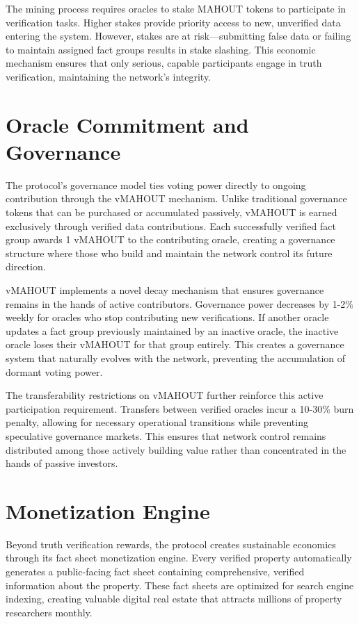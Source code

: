 The mining process requires oracles to stake MAHOUT tokens to participate in verification tasks. Higher stakes provide priority access to new, unverified data entering the system. However, stakes are at risk—submitting false data or failing to maintain assigned fact groups results in stake slashing. This economic mechanism ensures that only serious, capable participants engage in truth verification, maintaining the network's integrity.

\section{Oracle Commitment and Governance}

The protocol's governance model ties voting power directly to ongoing contribution through the vMAHOUT mechanism. Unlike traditional governance tokens that can be purchased or accumulated passively, vMAHOUT is earned exclusively through verified data contributions. Each successfully verified fact group awards 1 vMAHOUT to the contributing oracle, creating a governance structure where those who build and maintain the network control its future direction.

vMAHOUT implements a novel decay mechanism that ensures governance remains in the hands of active contributors. Governance power decreases by 1-2\% weekly for oracles who stop contributing new verifications. If another oracle updates a fact group previously maintained by an inactive oracle, the inactive oracle loses their vMAHOUT for that group entirely. This creates a governance system that naturally evolves with the network, preventing the accumulation of dormant voting power.

The transferability restrictions on vMAHOUT further reinforce this active participation requirement. Transfers between verified oracles incur a 10-30\% burn penalty, allowing for necessary operational transitions while preventing speculative governance markets. This ensures that network control remains distributed among those actively building value rather than concentrated in the hands of passive investors.

\section{Monetization Engine}

Beyond truth verification rewards, the protocol creates sustainable economics through its fact sheet monetization engine. Every verified property automatically generates a public-facing fact sheet containing comprehensive, verified information about the property. These fact sheets are optimized for search engine indexing, creating valuable digital real estate that attracts millions of property researchers monthly.

